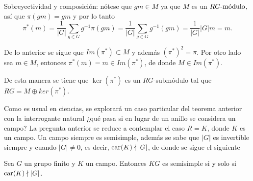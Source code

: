 \begin{proof*}
\begin{bulletList}
Sobreyectividad y composición: nótese que $gm \in M$ ya que $M$ es un $\modulo{RG}$, así que $\pi (gm) = gm$ y por lo tanto 
\[\pi ^* (m) = \frac{1}{|G|} \sum_{g \in G}g^{-1}\pi (gm) = \frac{1}{|G|} \sum_{g \in G}g^{-1}(gm) = \frac{1}{|G|}|G|m  = m.\]

De lo anterior se sigue que $Im(\pi^*) \subset M$ y además $(\pi^*)^2 = \pi $. Por otro lado sea $m \in M$, entonces $\pi ^* (m) = m \in Im(\pi^*)$, de donde $M \in Im(\pi^*)$. 

De esta manera se tiene que $\ker(\pi^*)$ es un $RG$-submódulo tal que $RG = M \oplus ker(\pi^*)$.\qedhere
\end{bulletList}
\end{proof*} 

Como es usual en ciencias, se explorará un caso particular del teorema anterior con la interrogante natural ¿qué pasa si en lugar de un anillo se considera un campo? La pregunta anterior se reduce a contemplar el caso $R = K$, donde $K$ es un campo. Un campo siempre es semisimple, además se sabe que $|G|$ es invertible siempre y cuando $|G| \neq 0$, es decir, $\car(K) \nmid |G|$, de donde se sigue el siguiente
\begin{corolario}\label{cor:car}
Sea $G$ un grupo finito y $K$ un campo. Entonces $KG$ es semisimple si y solo si $\car(K) \nmid |G|$.
\end{corolario}



